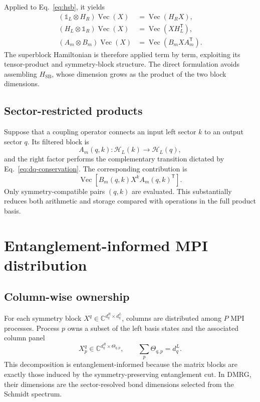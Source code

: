 \documentclass[11pt,a4paper]{article}
\newcommand{\Hil}{\mathcal H}
\newcommand{\OpVec}{\operatorname{Vec}}
\newcommand{\Id}{\mathbb 1}
\begin{document}
Applied to Eq.~\eqref{eq:hsb}, it yields
\begin{align}
  (\Id_L\otimes H_R)\OpVec(X)
    &=\OpVec(H_RX),\\
  (H_L\otimes\Id_R)\OpVec(X)
    &=\OpVec(XH_L^{\mathsf T}),\\
  (A_m\otimes B_m)\OpVec(X)
    &=\OpVec(B_mXA_m^{\mathsf T}).
\end{align}
The superblock Hamiltonian is therefore applied term by term, exploiting its
tensor-product and symmetry-block structure.  The direct formulation avoids
assembling $H_{\mathrm{SB}}$, whose dimension grows as the product of the two
block dimensions.

\subsection{Sector-restricted products}

Suppose that a coupling operator connects an input left sector $k$ to an
output sector $q$.  Its filtered block is
\begin{equation}
  A_m(q,k):\Hil_L(k)\longrightarrow\Hil_L(q),
\end{equation}
and the right factor performs the complementary transition dictated by
Eq.~\eqref{eq:dq-conservation}.  The corresponding contribution is
\begin{equation}
  \OpVec\!\left[B_m(q,k)X^kA_m(q,k)^{\mathsf T}\right].
  \label{eq:coupling-product}
\end{equation}
Only symmetry-compatible pairs $(q,k)$ are evaluated.  This substantially
reduces both arithmetic and storage compared with operations in the full
product basis.

\section{Entanglement-informed MPI distribution}

\subsection{Column-wise ownership}

For each symmetry block $X^q\in\mathbb C^{d_q^R\times d_q^L}$, columns are
distributed among $P$ MPI processes.  Process $p$ owns a subset of the left
basis states and the associated column panel
\begin{equation}
  X_p^q\in\mathbb C^{d_q^R\times\Theta_{q,p}},
  \qquad
  \sum_p\Theta_{q,p}=d_q^L.
\end{equation}
This decomposition is entanglement-informed because the matrix blocks are
exactly those induced by the symmetry-preserving entanglement cut.  In DMRG,
their dimensions are the sector-resolved bond dimensions selected from the
Schmidt spectrum.
\end{document}
